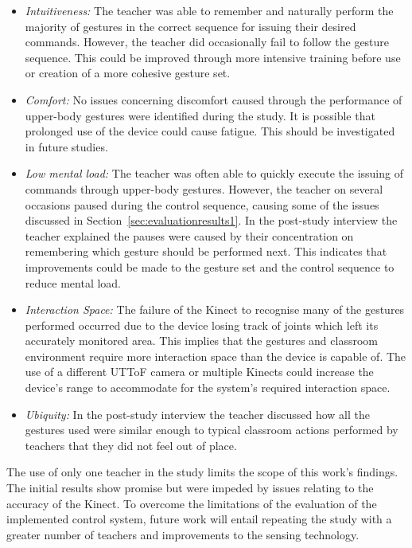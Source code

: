 \documentclass[manuscript, review, screen]{acmart}
\begin{document}
\begin{itemize}
\item \textit{{Intuitiveness:}}  The teacher was able to remember and naturally perform the majority of gestures in the correct sequence for issuing their desired commands.
However, the teacher did occasionally fail to follow the gesture sequence.
This could be improved through more intensive training before use or creation of a more cohesive gesture set.
\item \textit{{Comfort:}}  No issues concerning discomfort caused through the performance of upper-body gestures were identified during the study.
It is possible that prolonged use of the device could cause fatigue.
This should be investigated in future studies.
\item \textit{{Low mental load:}}  The teacher was often able to quickly execute the issuing of commands through upper-body gestures.
However, the teacher on several occasions paused during the control sequence, causing some of the issues discussed in Section~\ref{sec:evaluationresults1}.
In the post-study interview the teacher explained the pauses were caused by their concentration on remembering which gesture should be performed next.
This indicates that improvements could be made to the gesture set and the control sequence to reduce mental load.
\item \textit{{Interaction Space:}} The failure of the Kinect to recognise many of the gestures performed occurred due to the device losing track of joints which left its accurately monitored area.
This implies that the gestures and classroom environment require more interaction space than the device is capable of.
The use of a different \ac{UTToF} camera or multiple Kinects could increase the device's range to accommodate for the system's required interaction space.
\item \textit{{Ubiquity:}} In the post-study interview the teacher discussed how all the gestures used were similar enough to typical classroom actions performed by teachers that they did not feel out of place.\\ 
\end{itemize}

The use of only one teacher in the study limits the scope of this work's findings.
The initial results show promise but were impeded by issues relating to the accuracy of the Kinect.
To overcome the limitations of the evaluation of the implemented control system, future work will entail repeating the study with a greater number of teachers and improvements to the sensing technology.
\end{document}
